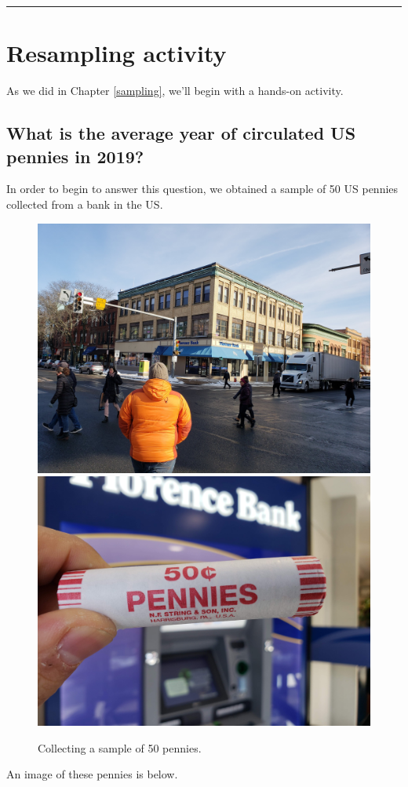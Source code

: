 \documentclass[12pt, krantz2,]{krantz}
\begin{document}
\begin{center}\rule{0.5\linewidth}{\linethickness}\end{center}

\hypertarget{resampling-activity}{%
\section{Resampling activity}\label{resampling-activity}}

As we did in Chapter \ref{sampling}, we'll begin with a hands-on activity.

\hypertarget{what-is-the-average-year-of-circulated-us-pennies-in-2019}{%
\subsection{What is the average year of circulated US pennies in 2019?}\label{what-is-the-average-year-of-circulated-us-pennies-in-2019}}

In order to begin to answer this question, we obtained a sample of 50 US pennies collected from a bank in the US.

\begin{figure}

{\centering \includegraphics[width=0.4\linewidth]{images/sampling/pennies/bank} \includegraphics[width=0.4\linewidth]{images/sampling/pennies/roll} 

}

\caption{Collecting a sample of 50 pennies.}\label{fig:resampling-exercise-a}
\end{figure}

An image of these pennies is below.
\end{document}

